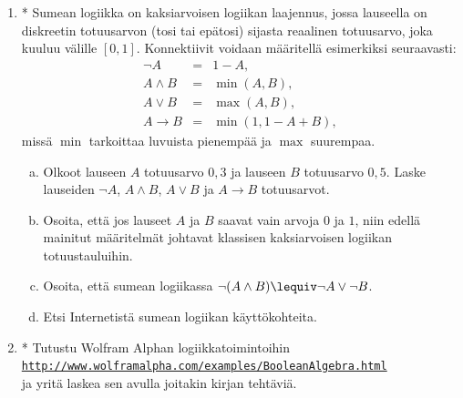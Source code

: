 \begin{enumerate}
\item * %
Sumean logiikka on kaksiarvoisen logiikan
laajennus, jossa lauseella on diskreetin totuusarvon
(tosi tai epätosi) sijasta reaalinen totuusarvo, joka
kuuluu välille $[0,1]$. Konnektiivit voidaan määritellä
esimerkiksi seuraavasti:
\[
\begin{array}{rcl}
\lnot A &=& 1-A,\\
A\land B &=& \min(A,B),\\
A\lor B &=& \max(A,B),\\
A\to B
&=& \min(1,1-A+B),
\end{array}
\]
missä $\min$ tarkoittaa luvuista pienempää ja $\max$
suurempaa.

\begin{enumerate}[a)]
\item Olkoot lauseen $A$ totuusarvo $0,3$ ja lauseen
$B$ totuusarvo $0,5$. Laske lauseiden $\lnot A$, $A\land
B$, $A\lor B$ ja $A \to B$ totuusarvot.
\item Osoita, että jos lauseet $A$ ja $B$ saavat
vain arvoja $0$ ja $1$, niin edellä mainitut määritelmät johtavat
klassisen kaksiarvoisen logiikan totuustauluihin.
\item Osoita, että sumean logiikassa $\lnot(A\land B)
\lequiv \lnot A \lor \lnot B$.
\item Etsi Internetistä sumean logiikan
käyttökohteita.
\end{enumerate}

\item * %
Tutustu Wolfram Alphan
logiikkatoimintoihin\\
\href{http://www.wolframalpha.com/examples/BooleanAlgebra.html}{{\tt http://www.wolframalpha.com/examples/BooleanAlgebra.html}}\\
ja yritä laskea sen avulla joitakin kirjan tehtäviä.


\end{enumerate}
